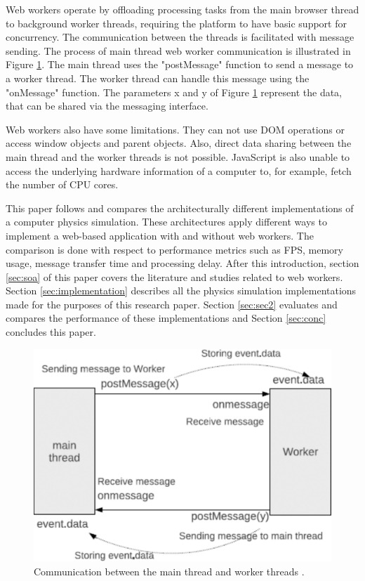 \documentclass[conference]{IEEEtran}
\begin{document}
Web workers operate by offloading processing tasks from the main browser thread to background worker threads, requiring the platform to have basic support for concurrency. 
The communication between the threads is facilitated with message sending. The process of main thread web worker communication is illustrated in Figure \ref{fig:figure1}. 
The main thread uses the "postMessage" function to send a message to a worker thread. The worker thread can handle this message using the "onMessage" function. The parameters x and y of Figure \ref{fig:figure1} represent the data, that can be shared via the messaging interface. \cite{doha, watanabe}

Web workers also have some limitations. They can not use DOM operations or access window objects and parent objects. Also, direct data sharing between the main thread and 
the worker threads is not possible. JavaScript is also unable to access the underlying hardware information of a computer to, for example, fetch the number of CPU cores. \cite{watanabe, verdu}

This paper follows and compares the architecturally different implementations of a computer physics simulation. These architectures apply different ways to implement a 
web-based application with and without web workers. The comparison is done with respect to performance metrics such as FPS, memory usage, message transfer time and processing delay. After this introduction, section \ref{sec:soa} of this paper covers the literature and studies related to web workers. Section \ref{sec:implementation} describes all the
physics simulation implementations made for the purposes of this research paper. Section \ref{sec:sec2} evaluates and compares the performance of these implementations and
Section \ref{sec:conc} concludes this paper.

\begin{figure}[ht]
	\centering
	\includegraphics[scale=0.25]{figs/figure1.png}
	\caption{Communication between the main thread and worker threads \cite{watanabe}.}
	\label{fig:figure1}
\end{figure}
\end{document}
